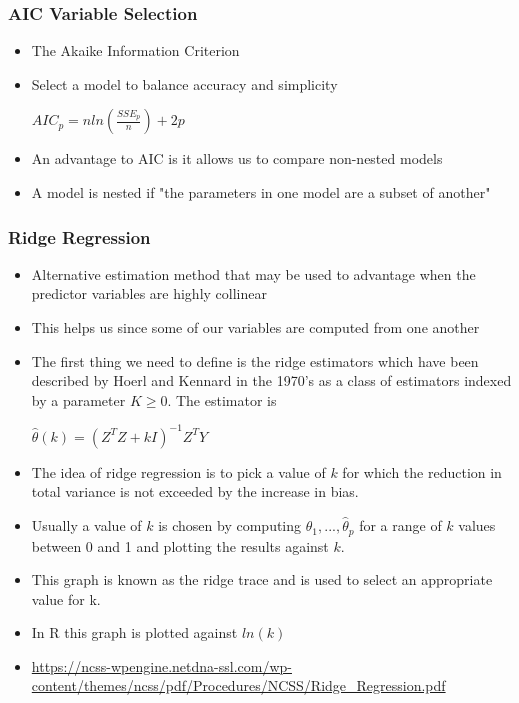 \documentclass{beamer}
\begin{document}
\begin{frame}
\frametitle{AIC Variable Selection}
	\begin{itemize}
		\item The Akaike Information Criterion
		\item Select a model to balance accuracy and simplicity
		\begin{center}$
			AIC_p = nln(\frac{SSE_p}{n}) + 2p	
		$\end{center}
		\item An advantage to AIC is it allows us to compare non-nested models
		\item A model is nested if "the parameters in one model are a subset of another"
	\end{itemize}
\end{frame}
\begin{frame}
\frametitle{Ridge Regression}
	\begin{itemize}
		\item Alternative estimation method that may be used to advantage when the predictor variables are highly collinear
		\item This helps us since some of our variables are computed from one another 
		\item The first thing we need to define is the ridge estimators which have been described by Hoerl and Kennard in the 1970's as a class of estimators indexed by a parameter $K \geq 0$. The estimator is
		\begin{center}$
			\hat{\theta}(k) = (Z^TZ + kI)^{-1}Z^TY 
			$\end{center}
	\end{itemize}
\end{frame}
\begin{frame}
	\begin{itemize}
		\item The idea of ridge regression is to pick a value of $k$ for which the reduction in total variance is not exceeded by the increase in bias. 
		\item Usually a value of $k$ is chosen by computing $\hat{\theta}_1,...,\hat{\theta}_p$ for a range of $k$ values between 0 and 1 and plotting the results against $k$. 
		\item This graph is known as the ridge trace and is used to select an appropriate value for k.
		\item In R this graph is plotted against $ln(k)$
		\item \url{https://ncss-wpengine.netdna-ssl.com/wp-content/themes/ncss/pdf/Procedures/NCSS/Ridge_Regression.pdf}
	\end{itemize}
\end{frame}
\end{document}
